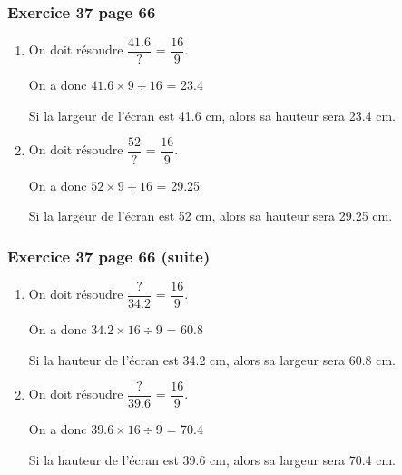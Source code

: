 \documentclass[xcolor={dvipsnames}, handout]{beamer}
\begin{document}
\begin{frame}
	\frametitle{Exercice 37 page 66}
	
	\begin{Large}
		\begin{enumerate}
			
			\item On doit résoudre $\dfrac{\num{41.6}}{?} $ = $\dfrac{16}{9}$. \pause %
			
			On a donc $\num{41.6} \times 9 \div 16 $ \pause = \num{23.4} %
			
			Si la largeur de l'écran est \num{41.6} cm, alors sa hauteur sera \num{23.4} cm.
			
			\vspace*{1cm}
			
			\item On doit résoudre $\dfrac{\num{52}}{?} $ = $\dfrac{16}{9}$. %
			
			On a donc $\num{52} \times 9 \div 16 $  = \num{29.25} %
			
			Si la largeur de l'écran est \num{52} cm, alors sa hauteur sera \num{29.25} cm.
			
			
		\end{enumerate}
	\end{Large}
	
\end{frame}


\begin{frame}
	\frametitle{Exercice 37 page 66 (suite)}
	
	\begin{Large}
		\begin{enumerate}
			

			
			\item On doit résoudre $\dfrac{?}{\num{34.2}} $ = $\dfrac{16}{9}$. \pause %
			
			On a donc $\num{34.2} \times 16 \div 9 $ \pause = \num{60.8} %
			
			Si la hauteur de l'écran est \num{34.2} cm, alors sa largeur sera \num{60.8} cm.
			
			\vspace*{1cm}
			
			\item On doit résoudre $\dfrac{?}{\num{39.6}} $ = $\dfrac{16}{9}$. %
			
			On a donc $\num{39.6} \times 16 \div 9 $ = \num{70.4} %
			
			Si la hauteur de l'écran est \num{39.6} cm, alors sa largeur sera \num{70.4} cm.
		\end{enumerate}
	\end{Large}
	
\end{frame}
\end{document}
